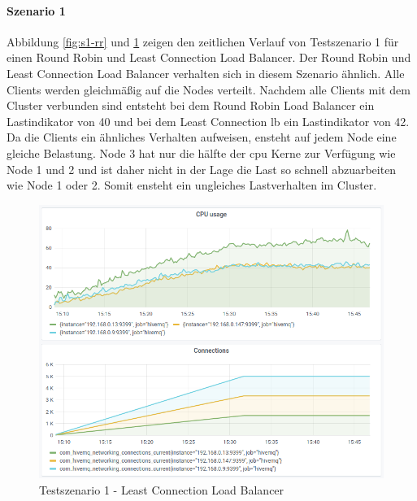 \paragraph{Szenario 1}
Abbildung \ref{fig:s1-rr} und \ref{fig:s1-lc} zeigen den zeitlichen Verlauf von Testszenario 1 für einen Round Robin und Least Connection Load Balancer.
Der Round Robin und Least Connection Load Balancer verhalten sich in diesem Szenario ähnlich. Alle Clients werden gleichmä{\ss}ig auf die Nodes verteilt.
Nachdem alle Clients mit dem Cluster verbunden sind entsteht bei dem Round Robin Load Balancer ein Lastindikator von 40 und bei dem Least Connection \ac{lb} ein Lastindikator von 42.
Da die Clients ein ähnliches Verhalten aufweisen, ensteht auf jedem Node eine gleiche Belastung. Node 3 hat nur die hälfte der \ac{cpu} Kerne zur Verfügung wie Node 1 und 2 und ist daher nicht in der Lage die Last so schnell abzuarbeiten wie Node 1 oder 2. Somit ensteht ein ungleiches Lastverhalten im Cluster.
\begin{figure}
    \centering
    \includegraphics[scale=0.8]{images/s1_lc.png}
    \caption{Testszenario 1 - Least Connection Load Balancer}
    \label{fig:s1-lc}
\end{figure}
